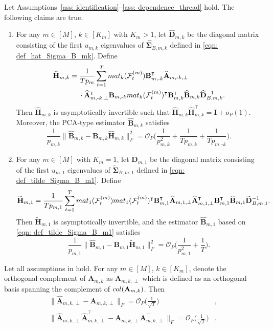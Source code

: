 \documentclass[10pt,a4paper]{amsart}
\def\bA{\mathbf{A}}
\def\bB{\mathbf{B}}
\def\bD{\mathbf{D}}
\def\bH{\mathbf{H}}
\def\bI{\mathbf{I}}
\def\bSigma{\boldsymbol{\Sigma}} \def\bOmega{\boldsymbol{\Omega}}
\def\cF{\mathcal{F}}
\def\cO{\mathcal{O}}
\def\mat{\textnormal{\textsc{mat}}}
\def\trans{\intercal}
\def\wh#1{\widehat{#1}}
\def\wt#1{\widetilde{#1}}
\begin{document}
\begin{theorem}\label{thm: local_loading}
Let Assumptions~\ref{ass: identification}--\ref{ass: dependence_thread} hold. The following claims are true.
\begin{enumerate}[itemsep=0pt, label = (\alph*), left = 0pt]
    \item For any $m\in[M]$, $k\in[K_m]$ with $K_m> 1$, let $\wh{\bD}_{m,k}$ be the diagonal matrix consisting of the first $u_{m,k}$ eigenvalues of $\wh\bSigma_{B,m,k}$ defined in \eqref{eqn: def_hat_Sigma_B_mk}. Define
    \begin{align*}
        \wh{\bH}_{m,k} &= \frac{1}{Tp_m} \sum_{t=1}^T \mat_k(\cF_t^{(m)}) \bB_{m,\text{-}k}^\trans \wh{\bA}_{m,\text{-}k,\perp} \\
        &\;\quad
        \cdot \wh{\bA}_{m,\text{-}k,\perp}^\trans \bB_{m,\text{-}k} \mat_k(\cF_t^{(m)})^\trans \bB_{m,k}^\trans \wh{\bB}_{m,k} \wh{\bD}_{B,m,k}^{-1} .
    \end{align*}
    Then $\wh{\bH}_{m,k}$ is asymptotically invertible such that $\wh{\bH}_{m,k} \wh{\bH}_{m,k}^\trans = \bI + o_P(1)$. Moreover, the PCA-type estimator $\wh{\bB}_{m,k}$ satisfies
    \[
    \frac{1}{p_{m,k}} \Big\| \wh{\bB}_{m,k} - \bB_{m,k} \wh{\bH}_{m,k} \Big\|_F^2 = \cO_P\Big( \frac{1}{p_{m,k}^2} + \frac{1}{T p_{m,k}} + \frac{1}{T p_{m,\text{-}k}} \Big) .
    \]
    \item For any $m\in[M]$ with $K_m= 1$, let $\wt{\bD}_{m,1}$ be the diagonal matrix consisting of the first $u_{m,1}$ eigenvalues of $\wt\bSigma_{B,m,1}$ defined in \eqref{eqn: def_tilde_Sigma_B_m1}. Define
    \[
    \wt{\bH}_{m,1} = \frac{1}{Tp_{m,1}} \sum_{t=1}^T \mat_1(\cF_t^{(m)}) \mat_1(\cF_t^{(m)})^\trans \bB_{m,1}^\trans \wh{\bA}_{m,1,\perp} \wh{\bA}_{m,1,\perp}^\trans \bB_{m,1}^\trans \wh{\bB}_{m,1} \wt{\bD}_{B,m,1}^{-1} .
    \]
    Then $\wt{\bH}_{m,1}$ is asymptotically invertible, and the estimator $\wh{\bB}_{m,1}$ based on \eqref{eqn: def_tilde_Sigma_B_m1} satisfies
    \[
    \frac{1}{p_{m,1}} \Big\| \wh{\bB}_{m,1} - \bB_{m,1} \wt{\bH}_{m,1} \Big\|_F^2 = \cO_P\Big( \frac{1}{p_{m,1}^2} + \frac{1}{T} \Big) .
    \]
\end{enumerate}
\end{theorem}

\begin{lemma}\label{lemma: A_perp_rate}
Let all assumptions in  hold. For any $m\in[M]$, $k\in[K_m]$, denote the orthogonal complement of $\bA_{m,k}$ as $\bA_{m,k,\perp}$ which is defined as an orthogonal basis spanning the complement of $\textnormal{col}(\bA_{m,k})$. Then
\begin{align*}
    \Big\| \wh{\bA}_{m,k,\perp} -\bA_{m,k,\perp} \Big\|_F = \cO_P\Big( \frac{1}{\sqrt{T}} \Big) &, \\
    \Big\| \wh{\bA}_{m,k,\perp} \wh{\bA}_{m,k,\perp}^\trans - \bA_{m,k,\perp} \bA_{m,k,\perp}^\trans \Big\|_F = \cO_P\Big( \frac{1}{\sqrt{T}} \Big) &.
\end{align*}
\end{lemma}
\end{document}
